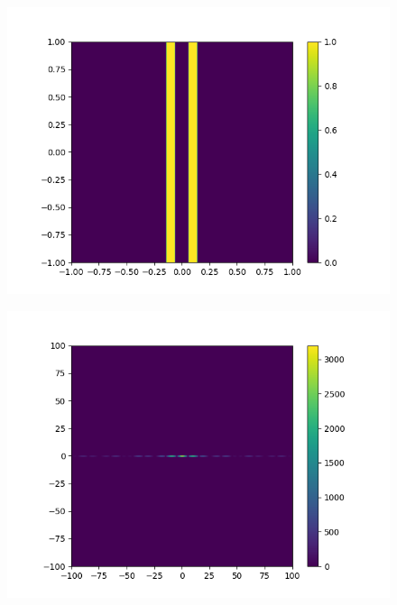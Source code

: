 \begin{figure}[htbp]
\begin{minipage}[ht]{0.48\hsize}
		\includegraphics[width=\linewidth]{src/figures/result/ds2_original_estimation.png}
		\label{subfig:amplitude_sim_dual2_original}
	\end{minipage}
	\begin{minipage}[ht]{0.48\hsize}\centering
		\includegraphics[width=\linewidth]{src/figures/result/ds2_amplitude_estimation.png}
		\label{subfig:amplitude_sim_dual2}
	\end{minipage}
	\begin{minipage}[ht]{0.48\hsize}\centering

\end{minipage}
\end{figure}
